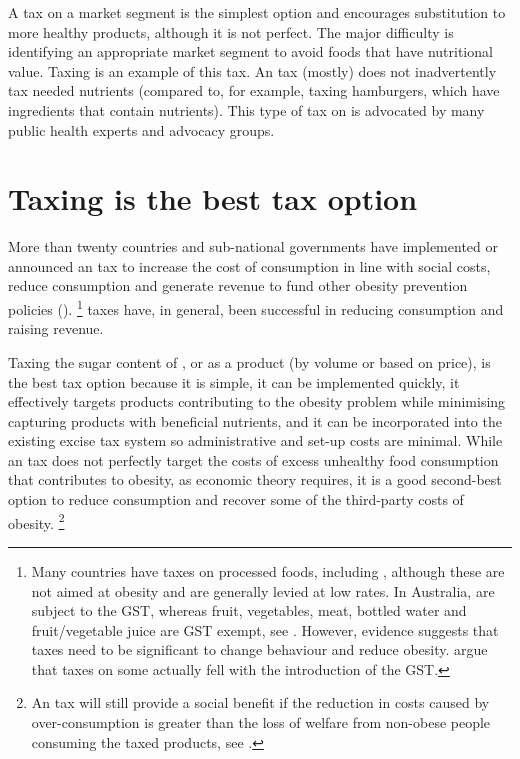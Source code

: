 \documentclass[embargoed]{grattan}
\begin{document}
A tax on a market segment is the simplest option and encourages substitution to more healthy products, although it is not perfect.
The major difficulty is identifying an appropriate market segment to avoid foods that have nutritional value.
Taxing \SSBs{} is an example of this tax.
An \SSB{} tax (mostly) does not inadvertently tax needed nutrients (compared to, for example, taxing hamburgers, which have ingredients that contain nutrients).
This type of tax on \SSBs{} is advocated by many public health experts and advocacy groups.

\section{Taxing \SSBs{} is the best tax option }\label{taxing-ssbs-is-the-best-tax-option}

More than twenty countries and sub-national governments have implemented or announced an \SSB{} tax to increase the cost of \SSB{} consumption in line with social costs, reduce \SSB{} consumption and generate revenue to fund other obesity prevention policies ().%
\footnote{Many countries have taxes on processed foods, including \SSBs{}, although these are not aimed at obesity and are generally levied at low rates. In Australia, \SSBs{} are subject to the GST, whereas fruit, vegetables, meat, bottled water and fruit/vegetable juice are GST exempt, see \textcite{Office2016GSTstatusfood}.
However, evidence suggests that taxes need to be significant to change behaviour and reduce obesity. \textcite{Australia2014Rethinktaxdiscussion} argue that taxes on some \SSBs{} actually fell with the introduction of the GST.} \SSB{} taxes have, in general, been successful in reducing consumption and raising revenue.

Taxing the sugar content of \SSBs{}, or \SSBs{} as a product (by volume or based on price), is the best tax option because it is simple, it can be implemented quickly, it effectively targets products contributing to the obesity problem while minimising capturing products with beneficial nutrients, and it can be incorporated into the existing excise tax system so administrative and set-up costs are minimal.
While an \SSB{} tax does not perfectly target the costs of excess unhealthy food consumption that contributes to obesity, as economic theory requires, it is a good second-best option to reduce consumption and recover some of the third-party costs of obesity.%
\footnote{An \SSB{} tax will still provide a social benefit if the reduction in costs caused by over-consumption is greater than the loss of welfare from non-obese people consuming the taxed products, see \textcite{CnossenExcisetaxationAustralia}.}
\end{document}
